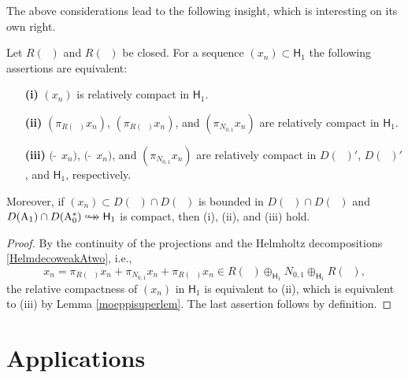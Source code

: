 \documentclass[a4paper]{amsart}
\renewcommand{\H}{\mathsf{H}}
\DeclareMathOperator{\Az}{A_{0}}
\DeclareMathOperator{\Azs}{A_{0}^{*}}
\DeclareMathOperator{\Ao}{A_{1}}
\DeclareMathOperator{\Aos}{A_{1}^{*}}
\newcommand{\cptemb}{\hookto\hspace*{-0.85em}\hookto}
\begin{document}
The above considerations lead to the following insight, which is interesting on its own right.

\begin{lem}
Let $R(\Az)$ and $R(\Ao)$ be closed.
For a sequence $(x_{n})\subset\H_{1}$ the following assertions are equivalent:
\begin{itemize}
\item[\bf(i)]
$(x_{n})$ is relatively compact in $\H_{1}$.
\item[\bf(ii)]
$(\pi_{R(\Aos)}x_{n})$, $(\pi_{R(\Az)}x_{n})$, and $(\pi_{N_{0,1}}x_{n})$
are relatively compact in $\H_{1}$.
\item[\bf(iii)]
$\big(\widetilde{\Azs}\,x_{n}\big)$, 
$\big(\widetilde{\Ao}\,x_{n}\big)$,
and $(\pi_{N_{0,1}}x_{n})$ are relatively compact 
in $D(\Az)'$, $D(\Aos)'$, and $\H_{1}$, respectively.
\end{itemize}
Moreover, if $(x_{n})\subset D(\Ao)\cap D(\Azs)$ is bounded in $D(\Ao)\cap D(\Azs)$
and $D(\Ao)\cap D(\Azs)\cptemb\H_{1}$ is compact,
then (i), (ii), and (iii) hold.
\end{lem}

\begin{proof}
By the continuity of the projections
and the Helmholtz decompositions \eqref{HelmdecoweakAtwo}, i.e.,
$$x_{n}=\pi_{R(\Az)}x_{n}+\pi_{N_{0,1}}x_{n}+\pi_{R(\Aos)}x_{n}\in R(\Az)\oplus_{\H_{1}}N_{0,1}\oplus_{\H_{1}}R(\Aos),$$
the relative compactness of $(x_{n})$ in $\H_{1}$ is equivalent to (ii),
which is equivalent to (iii) by Lemma \ref{moeppisuperlem}.
The last assertion follows by definition.
\end{proof}

\section{Applications}
\end{document}
